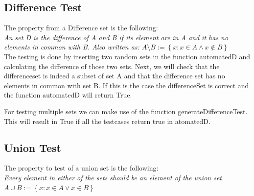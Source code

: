 \documentclass{article}
\begin{document}
\subsection*{Difference Test}
The property from a Difference set is the following:\\
 \emph{
An set D is the difference of A and B if its element are in A and it has no elements in common with B. Also written as:
$ A \setminus B := \left\{ x: x \in A \land x \not \in B\right\} $ }\\

The testing is done by inserting two random sets in the function automatedD and calculating the difference of those two sets. Next, we will check that the differenceset is indeed a subset of set A and that the difference set has no elements in common with set B. If this is the case the differenceSet is correct and the function automatedD will return True. 

For testing multiple sets we can make use of the function generateDifferenceTest. This will result in True if all the testcases return true in atomatedD.


\subsection*{Union Test}
The property to test of a union set is the following: \\ \emph{
Every element in either of the sets should be an element of the union set.
$ A \cup B := \left\{ x: x \in A \lor x \in B\right\} $ }\\
\end{document}
